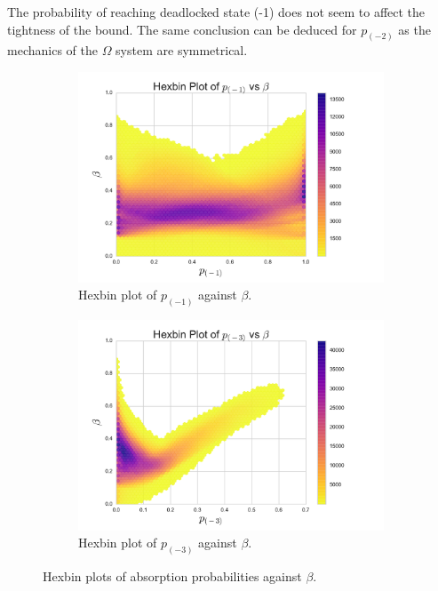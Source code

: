 \documentclass{article}
\numberwithin{equation}{section}
\begin{document}
The probability of reaching deadlocked state (-1) does not seem to affect the tightness of the bound.
The same conclusion can be deduced for $p_{(-2)}$ as the mechanics of the $\Omega$ system are symmetrical.

\begin{figure}[!htbp]
\begin{subfigure}[b]{0.5\textwidth}
  \includegraphics[width=\textwidth]{images/hexbin-1}
  \caption{Hexbin plot of $p_{(-1)}$ against $\beta$.}
  \label{fig:hexbin_p1}
\end{subfigure}
\begin{subfigure}[b]{0.5\textwidth}
  \includegraphics[width=\textwidth]{images/hexbin-3}
  \caption{Hexbin plot of $p_{(-3)}$ against $\beta$.}
  \label{fig:hexbin_p3}
\end{subfigure}
\caption{Hexbin plots of absorption probabilities against $\beta$.}
\label{fig:hexbinplot_ratio_analysis}
\end{figure}
\end{document}
